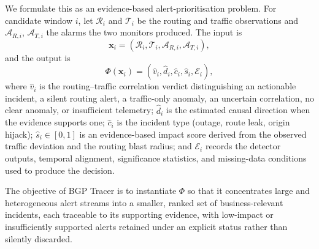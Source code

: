 We formulate this as an evidence-based alert-prioritisation problem. For
candidate window $i$, let $\mathcal{R}_i$ and $\mathcal{T}_i$ be the
routing and traffic observations and $\mathcal{A}_{R,i}$, $\mathcal{A}_{T,i}$
the alarms the two monitors produced. The input is
\[
    \mathbf{x}_i = (\mathcal{R}_i,\mathcal{T}_i,\mathcal{A}_{R,i},\mathcal{A}_{T,i}),
\]
and the output is
\begin{equation}
    \Phi(\mathbf{x}_i) = (\hat{v}_i,\hat{d}_i,\hat{c}_i,\hat{s}_i,\mathcal{E}_i),
    \label{eq:problem}
\end{equation}
where $\hat{v}_i$ is the routing--traffic correlation verdict
distinguishing an actionable incident, a silent routing alert, a
traffic-only anomaly, an uncertain correlation, no clear anomaly, or
insufficient telemetry; $\hat{d}_i$ is the estimated causal direction
when the evidence supports one; $\hat{c}_i$ is the incident type
(outage, route leak, origin hijack); $\hat{s}_i\in[0,1]$ is an
evidence-based impact score derived from the observed traffic deviation
and the routing blast radius; and $\mathcal{E}_i$ records the detector
outputs, temporal alignment, significance statistics, and missing-data
conditions used to produce the decision.

The objective of BGP Tracer is to instantiate $\Phi$ so that it
concentrates large and heterogeneous alert streams into a smaller, ranked
set of business-relevant incidents, each traceable to its supporting
evidence, with low-impact or insufficiently supported alerts retained
under an explicit status rather than silently discarded.

